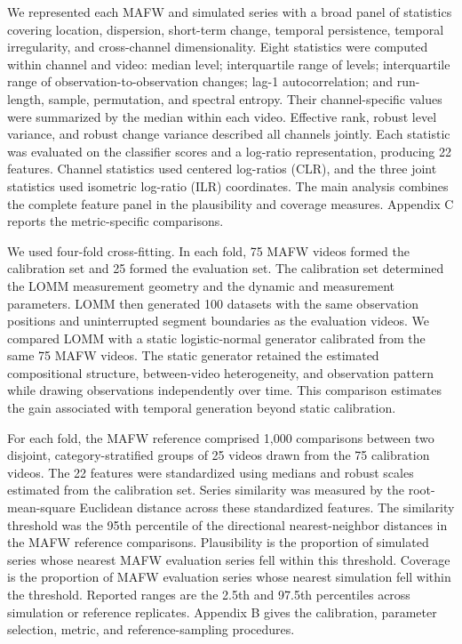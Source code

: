 \documentclass[
]{article}
\begin{document}
We represented each MAFW and simulated series with a broad panel of
statistics covering location, dispersion, short-term change, temporal
persistence, temporal irregularity, and cross-channel dimensionality.
Eight statistics were computed within channel and video: median level;
interquartile range of levels; interquartile range of
observation-to-observation changes; lag-1 autocorrelation; and
run-length, sample, permutation, and spectral entropy. Their
channel-specific values were summarized by the median within each video.
Effective rank, robust level variance, and robust change variance
described all channels jointly. Each statistic was evaluated on the
classifier scores and a log-ratio representation, producing 22 features.
Channel statistics used centered log-ratios (CLR), and the three joint
statistics used isometric log-ratio (ILR) coordinates. The main analysis
combines the complete feature panel in the plausibility and coverage
measures. Appendix C reports the metric-specific comparisons.

We used four-fold cross-fitting. In each fold, 75 MAFW videos formed the
calibration set and 25 formed the evaluation set. The calibration set
determined the LOMM measurement geometry and the dynamic and measurement
parameters. LOMM then generated 100 datasets with the same observation
positions and uninterrupted segment boundaries as the evaluation videos.
We compared LOMM with a static logistic-normal generator calibrated from
the same 75 MAFW videos. The static generator retained the estimated
compositional structure, between-video heterogeneity, and observation
pattern while drawing observations independently over time. This
comparison estimates the gain associated with temporal generation beyond
static calibration.

For each fold, the MAFW reference comprised 1,000 comparisons between
two disjoint, category-stratified groups of 25 videos drawn from the 75
calibration videos. The 22 features were standardized using medians and
robust scales estimated from the calibration set. Series similarity was
measured by the root-mean-square Euclidean distance across these
standardized features. The similarity threshold was the 95th percentile
of the directional nearest-neighbor distances in the MAFW reference
comparisons. Plausibility is the proportion of simulated series whose
nearest MAFW evaluation series fell within this threshold. Coverage is
the proportion of MAFW evaluation series whose nearest simulation fell
within the threshold. Reported ranges are the 2.5th and 97.5th
percentiles across simulation or reference replicates. Appendix B gives
the calibration, parameter selection, metric, and reference-sampling
procedures.
\end{document}
